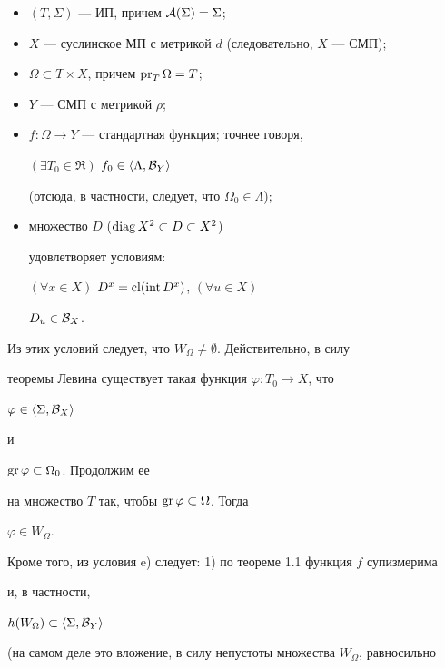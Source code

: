 \begin{itemize}


\item[a)] $(T,\Sigma)$ --- ИП, причем ${\cal A}(\Sigma)=\Sigma$;


\item[b)] $X$ --- суслинское МП с метрикой $d$ (следовательно, $X$ --- СМП);


\item[c)] $\Omega\subset T\times X$, причем $\operatorname{pr}_T\Omega=T$;


\item[d)] $Y$ --- СМП с метрикой $\rho$;


\item[e)] $f:\Omega\to Y$ --- стандартная функция; точнее говоря,


$(\exists T_0\in\Re)$ \; $f_0\in\langle \Lambda,{\cal B}_Y\rangle$


(отсюда, в частности, следует, что $\Omega_0\in\Lambda$);


\item[f)] множество $D$ ($\operatorname{diag} X^2\subset D\subset X^2$)


удовлетворяет условиям:


$(\forall x\in X)$ $D^x=\operatorname{cl}(\operatorname{int} D^x)$, $(\forall u\in X)$


$D_u\in {\cal B}_X$.


\end{itemize}





Из этих условий следует, что $W_\Omega\ne\emptyset$. Действительно, в силу


теоремы Левина существует такая функция $\varphi:T_0\to X$, что


$\varphi\in\langle \Sigma,{\cal B}_X\rangle $


и


$\operatorname{gr}\varphi\subset\Omega_0$. Продолжим ее


на множество $T$ так, чтобы $\operatorname{gr}\varphi\subset\Omega$. Тогда


$\varphi\in W_\Omega$.





Кроме того, из условия e) следует: 1) по теореме 1.1 функция $f$ супизмерима


и, в частности,


$h(W_\Omega)\subset\langle \Sigma,{\cal B}_Y\rangle $


(на самом деле это вложение, в силу непустоты множества $W_\Omega$, равносильно


